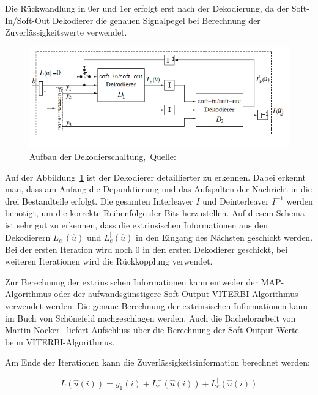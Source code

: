 Die Rückwandlung in 0er und 1er erfolgt erst nach der Dekodierung, da der Soft-In/Soft-Out Dekodierer die genauen Signalpegel bei Berechnung der Zuverlässigkeitswerte verwendet. 

\begin{figure}[th]
\centering
\includegraphics[width=\ScaleIfNeeded]{pictures/TurboDecoderSchema}
\caption{Aufbau der Dekodierschaltung,~Quelle:~\cite[262]{schoenfeld2012informations}}
\label{pic:decoderSchema}
\end{figure}

Auf der Abbildung~\ref{pic:decoderSchema} ist der Dekodierer detaillierter zu erkennen. Dabei erkennt man, dass am Anfang die Depunktierung und das Aufspalten der Nachricht in die drei Bestandteile erfolgt. Die gesamten Interleaver $I$ und Deinterleaver $I^{-1}$ werden benötigt, um die korrekte Reihenfolge der Bits herzustellen. Auf diesem Schema ist sehr gut zu erkennen, dass die extrinsischen Informationen aus den Dekodierern $L^-_e(\widehat{u})$ und $L^|_e(\widehat{u})$ in den Eingang des Nächsten geschickt werden. Bei der ersten Iteration wird noch 0 in den ersten Dekodierer geschickt, bei weiteren Iterationen wird die Rückkopplung verwendet.

Zur Berechnung der extrinsischen Informationen kann entweder der MAP-Algorithmus \cite[233-236]{schoenfeld2012informations} oder der aufwandsgünstigere Soft-Output VITERBI-Algorithmus \cite[222-233]{schoenfeld2012informations} verwendet werden. Die genaue Berechnung der extrinsischen Informationen kann im Buch von Schönefeld \cite[S.~263~f.]{schoenfeld2012informations} nachgeschlagen werden. Auch die Bachelorarbeit von Martin Nocker~\cite[7-11]{nocker} liefert Aufschluss über die Berechnung der Soft-Output-Werte beim VITERBI-Algorithmus.

Am Ende der Iterationen kann die Zuverlässigkeitsinformation berechnet werden:

\begin{equation}
L(\widehat{u}(i))=y_1(i)+L^-_e(\widehat{u}(i))+L^|_e(\widehat{u}(i))
\label{eq:resultDecode}
\end{equation}

